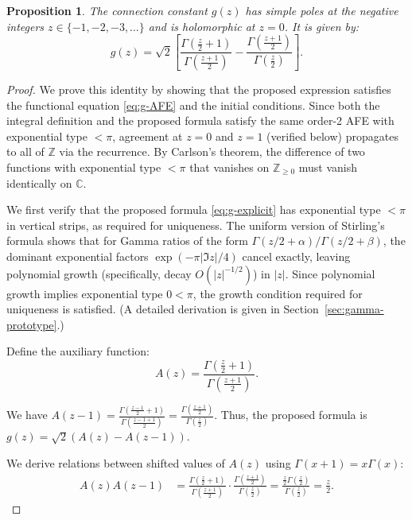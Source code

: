\documentclass[10pt,a4paper]{amsart}
\newtheorem{proposition}{Proposition}
\newcommand{\C}{\mathbb{C}}
\newcommand{\N}{\mathbb{Z}_{\ge 0}}
\newcommand{\Z}{\mathbb{Z}}
\begin{document}
\begin{proposition}\label{prop:g-explicit}
The connection constant $g(z)$ has simple poles at the negative integers $z \in \{-1,-2,-3,\ldots\}$ and is holomorphic at $z=0$. It is given by:
\begin{equation}\label{eq:g-explicit}
g(z) = \sqrt{2}\left[\frac{\Gamma\left(\frac{z}{2}+1\right)}{\Gamma\left(\frac{z+1}{2}\right)} - \frac{\Gamma\left(\frac{z+1}{2}\right)}{\Gamma\left(\frac{z}{2}\right)}\right].
\end{equation}
\end{proposition}

\begin{proof}
We prove this identity by showing that the proposed expression satisfies the functional equation \eqref{eq:g-AFE} and the initial conditions. Since both the integral definition and the proposed formula satisfy the same order-2 AFE with exponential type $<\pi$, agreement at $z=0$ and $z=1$ (verified below) propagates to all of $\Z$ via the recurrence. By Carlson's theorem, the difference of two functions with exponential type $<\pi$ that vanishes on $\N$ must vanish identically on $\C$.

We first verify that the proposed formula \eqref{eq:g-explicit} has exponential type $<\pi$ in vertical strips, as required for uniqueness. The uniform version of Stirling's formula shows that for Gamma ratios of the form $\Gamma(z/2+\alpha)/\Gamma(z/2+\beta)$, the dominant exponential factors $\exp(-\pi|\Im z|/4)$ cancel exactly, leaving polynomial growth (specifically, decay $O(|z|^{-1/2})$) in $|z|$. Since polynomial growth implies exponential type $0 < \pi$, the growth condition required for uniqueness is satisfied. (A detailed derivation is given in Section~\ref{sec:gamma-prototype}.)

Define the auxiliary function:
$$A(z) = \frac{\Gamma\left(\frac{z}{2}+1\right)}{\Gamma\left(\frac{z+1}{2}\right)}.$$

We have $A(z-1) = \frac{\Gamma\left(\frac{z-1}{2}+1\right)}{\Gamma\left(\frac{z-1+1}{2}\right)} = \frac{\Gamma\left(\frac{z+1}{2}\right)}{\Gamma\left(\frac{z}{2}\right)}$.
Thus, the proposed formula is $g(z) = \sqrt{2}(A(z) - A(z-1))$.

We derive relations between shifted values of $A(z)$ using $\Gamma(x+1)=x\Gamma(x)$:
\begin{align*}
A(z)A(z-1) &= \frac{\Gamma\left(\frac{z}{2}+1\right)}{\Gamma\left(\frac{z+1}{2}\right)} \cdot \frac{\Gamma\left(\frac{z+1}{2}\right)}{\Gamma\left(\frac{z}{2}\right)} = \frac{\frac{z}{2}\Gamma\left(\frac{z}{2}\right)}{\Gamma\left(\frac{z}{2}\right)} = \frac{z}{2}.
\end{align*}


\end{proof}
\end{document}
